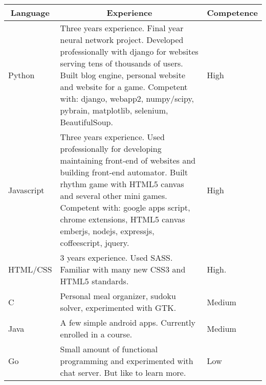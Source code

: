  \begin{minipage}[t]{\listitemmaincolumnwidth}
 \begin{tabular}{ | l | p{5cm} | l |}
 \multicolumn{1}{c}{\bfseries Language} & \multicolumn{1}{c}{\bfseries Experience} & \multicolumn{1}{c}{\bfseries Competence} \\ \hline
 \hline Python & Three years experience. Final year neural network project. Developed professionally with django for websites serving tens of thousands of users. Built blog engine, personal website and website for a game. Competent with: django, webapp2, numpy/scipy, pybrain, matplotlib, selenium, BeautifulSoup. & High \\ 
 \hline Javascript & Three years experience. Used professionally for developing maintaining front-end of websites and building front-end automator. Built rhythm game with HTML5 canvas and several other mini games. Competent with: google apps script, chrome extensions, HTML5 canvas emberjs, nodejs, expressjs, coffeescript, jquery. & High \\ \hline HTML/CSS & 3 years experience. Used SASS. Familiar with many new CSS3 and HTML5 standards. & High. \\
 \hline C & Personal meal organizer, sudoku solver, experimented with GTK. & Medium \\
 \hline Java & A few simple android apps. Currently enrolled in a course. & Medium \\
 \hline Go & Small amount of functional programming and experimented with chat server. But like to learn more. & Low \\
\end{tabular}\end{minipage}

